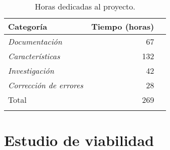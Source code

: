 \begin{longtable}[]{@{}lrr@{}}
\toprule
\begin{minipage}[b]{0.37\columnwidth}\raggedright\strut
Categoría\strut
\end{minipage} & \begin{minipage}[b]{0.37\columnwidth}\raggedleft\strut
Tiempo (horas)\strut
\end{minipage}\tabularnewline
\midrule
\endhead
\begin{minipage}[t]{0.37\columnwidth}\raggedright\strut
\emph{Documentación}\strut
\end{minipage} & \begin{minipage}[t]{0.37\columnwidth}\raggedleft\strut
67\strut
\end{minipage}\tabularnewline
\begin{minipage}[t]{0.37\columnwidth}\raggedright\strut
\emph{Características}\strut
\end{minipage} & \begin{minipage}[t]{0.37\columnwidth}\raggedleft\strut
132\strut
\end{minipage}\tabularnewline
\begin{minipage}[t]{0.37\columnwidth}\raggedright\strut
\emph{Investigación}\strut
\end{minipage}& \begin{minipage}[t]{0.37\columnwidth}\raggedleft\strut
42\strut
\end{minipage}\tabularnewline
\begin{minipage}[t]{0.37\columnwidth}\raggedright\strut
\emph{Corrección de errores}\strut
\end{minipage} & \begin{minipage}[t]{0.37\columnwidth}\raggedleft\strut
28\strut
\end{minipage}\tabularnewline
\midrule
\begin{minipage}[t]{0.37\columnwidth}\raggedright\strut
Total\strut
\end{minipage} & \begin{minipage}[t]{0.37\columnwidth}\raggedleft\strut
269\strut
\end{minipage}\tabularnewline
\bottomrule
\caption{Horas dedicadas al proyecto.}
\end{longtable}




\section{Estudio de viabilidad}

